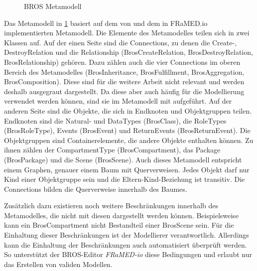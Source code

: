 \begin{figure}
%
    \caption{BROS Metamodell}%
    \label{fig:brosMetamodel}
\end{figure}


Das Metamodell in \cref{fig:brosMetamodel} basiert auf dem von \cite{Schoen} und dem in FRaMED.io implementierten Metamodell.
Die Elemente des Metamodelles teilen sich in zwei Klassen auf.
Auf der einen Seite sind die Connections, zu denen die Create-, DestroyRelation und die Relationship (BrosCreateRelation, BrosDestroyRelation, BrosRelationship) gehören.
Dazu zählen auch die vier Connections im oberen Bereich des Metamodelles (BrosInheritance, BrosFulfillment, BrosAggregation, BrosComposition).
Diese sind für die weitere Arbeit nicht relevant und werden deshalb ausgegraut dargestellt.
Da diese aber auch häufig für die Modellierung verwendet werden können, sind sie im Metamodell mit aufgeführt.
Auf der anderen Seite sind die Objekte, die sich in Endknoten und Objektgruppen teilen.
Endknoten sind die Natural- und DataTypes (BrosClass), die RoleTypes (BrosRoleType), Events (BrosEvent) und ReturnEvents (BrosReturnEvent).
Die Objektgruppen sind Containerelemente, die andere Objekte enthalten können.
Zu ihnen zählen der CompartmentType (BrosCompartment), das Package (BrosPackage) und die Scene (BrosScene).
Auch dieses Metamodell entspricht einem Graphen, genauer einem Baum mit Querverweisen.
Jedes Objekt darf nur Kind einer Objektgruppe sein und die Eltern-Kind-Beziehung ist transitiv.
Die Connections bilden die Querverweise innerhalb des Baumes.

Zusätzlich dazu existieren noch weitere Beschränkungen innerhalb des Metamodelles, die nicht mit diesen dargestellt werden können.
Beispielsweise kann ein BrosCompartment nicht Bestandteil einer BrosScene sein.
Für die Einhaltung dieser Beschränkungen ist der Modellierer verantwortlich.
Allerdings kann die Einhaltung der Beschränkungen auch automatisiert überprüft werden.
So unterstützt der BROS-Editor \emph{FRaMED-io} diese Bedingungen und erlaubt nur das Erstellen von validen Modellen.
